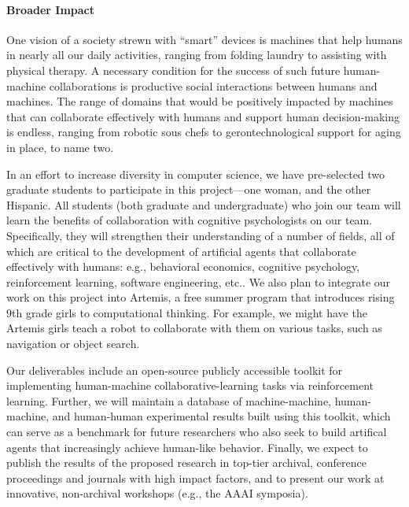 

\vspace{\up}
\paragraph{Broader Impact}

One vision of a society strewn with ``smart'' devices is
machines that help humans in nearly all our daily activities, 
ranging from folding laundry to assisting with physical therapy.
A necessary condition for the success of such future human-machine collaborations 
is productive social interactions between humans and machines.  
%
The range of domains that would be positively impacted by machines
that can collaborate effectively with humans and support human
decision-making is endless, ranging from robotic sous chefs to
gerontechnological support for aging in place, to name two.


In an effort to increase diversity in computer science, we have
pre-selected two graduate students to participate in this
project---one woman, and the other Hispanic.  All students (both
graduate and undergraduate) who join our team will learn the benefits
of collaboration with cognitive psychologists on our team.  Specifically, they will
strengthen their understanding of a number of fields, all of which are
critical to the development of artificial agents that collaborate
effectively with humans: e.g., behavioral economics, cognitive
psychology, reinforcement learning, software engineering, etc..
%
We also plan to integrate our work on this project into Artemis, a
free summer program that introduces rising 9th grade girls to
computational thinking.
For example, we might have the Artemis girls teach a robot to
collaborate with them on various tasks, such as navigation or object search.

Our deliverables include an open-source publicly accessible toolkit
for implementing human-machine collaborative-learning tasks via
reinforcement learning. Further, we will maintain a database of
machine-machine, human-machine, and human-human experimental results
built using this toolkit, which can serve as a benchmark for future
researchers who also seek to build artifical agents that increasingly
achieve human-like behavior.
%
Finally, we expect to publish the results of the proposed research in
top-tier archival, conference proceedings and journals with high
impact factors, and to present our work at innovative, non-archival
workshops (e.g., the AAAI symposia).

